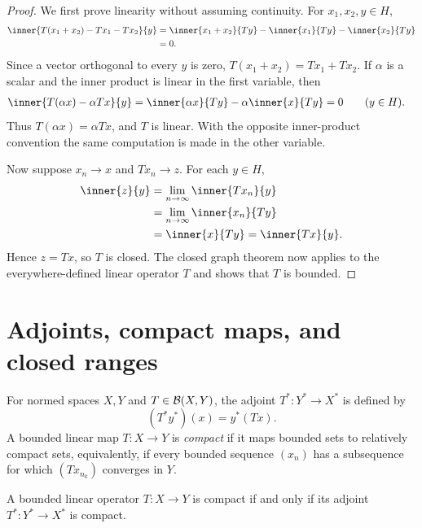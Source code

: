 \begin{proof}
We first prove linearity without assuming continuity.  For
$x_1,x_2,y\in H$,
\[
\begin{aligned}
  \inner{T(x_1+x_2)-Tx_1-Tx_2}{y}
   &=\inner{x_1+x_2}{Ty}
     -\inner{x_1}{Ty}
     -\inner{x_2}{Ty}\\
   &=0.
\end{aligned}
\]
Since a vector orthogonal to every $y$ is zero,
$T(x_1+x_2)=Tx_1+Tx_2$.  If $\alpha$ is a scalar and the inner product is
linear in the first variable, then
\[
\begin{aligned}
  \inner{T(\alpha x)-\alpha Tx}{y}
   &=\inner{\alpha x}{Ty}-\alpha\inner{x}{Ty}=0
   \qquad(y\in H).
\end{aligned}
\]
Thus $T(\alpha x)=\alpha Tx$, and $T$ is linear.  With the opposite
inner-product convention the same computation is made in the other variable.

Now suppose $x_n\to x$ and $Tx_n\to z$.  For each $y\in H$,
\[
\begin{aligned}
  \inner{z}{y}
   &=\lim_{n\to\infty}\inner{Tx_n}{y}\\
   &=\lim_{n\to\infty}\inner{x_n}{Ty}\\
   &=\inner{x}{Ty}
    =\inner{Tx}{y}.
\end{aligned}
\]
Hence $z=Tx$, so $T$ is closed.  The closed graph theorem now applies to the
everywhere-defined linear operator $T$ and shows that $T$ is bounded.
\end{proof}

\section{Adjoints, compact maps, and closed ranges}

\begin{notedefinition}
For normed spaces $X,Y$ and $T\in\mathcal{B}(X,Y)$, the adjoint
$T^*\colon Y^*\to X^*$ is defined by
\[
  (T^*y^*)(x)=y^*(Tx).
\]
A bounded linear map $T\colon X\to Y$ is \emph{compact} if it maps bounded
sets to relatively compact sets, equivalently, if every bounded sequence
$(x_n)$ has a subsequence for which $(Tx_{n_k})$ converges in $Y$.
\end{notedefinition}

\begin{notetheorem}
A bounded linear operator $T\colon X\to Y$ is compact if and only if its
adjoint $T^*\colon Y^*\to X^*$ is compact.
\end{notetheorem}

